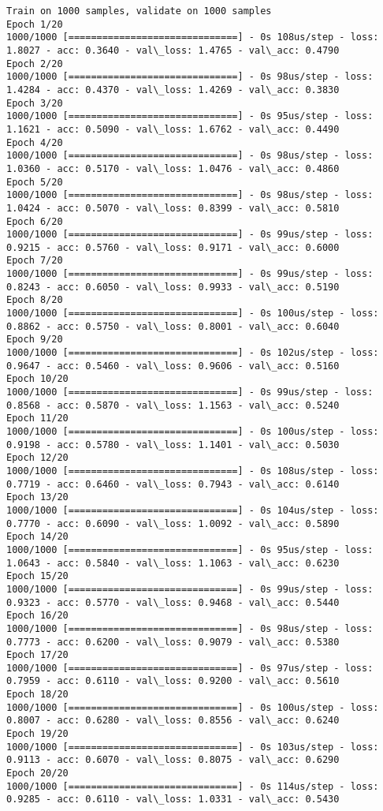 \documentclass[11pt]{article}
\begin{document}
    \begin{Verbatim}[commandchars=\\\{\}]
Train on 1000 samples, validate on 1000 samples
Epoch 1/20
1000/1000 [==============================] - 0s 108us/step - loss: 1.8027 - acc: 0.3640 - val\_loss: 1.4765 - val\_acc: 0.4790
Epoch 2/20
1000/1000 [==============================] - 0s 98us/step - loss: 1.4284 - acc: 0.4370 - val\_loss: 1.4269 - val\_acc: 0.3830
Epoch 3/20
1000/1000 [==============================] - 0s 95us/step - loss: 1.1621 - acc: 0.5090 - val\_loss: 1.6762 - val\_acc: 0.4490
Epoch 4/20
1000/1000 [==============================] - 0s 98us/step - loss: 1.0360 - acc: 0.5170 - val\_loss: 1.0476 - val\_acc: 0.4860
Epoch 5/20
1000/1000 [==============================] - 0s 98us/step - loss: 1.0424 - acc: 0.5070 - val\_loss: 0.8399 - val\_acc: 0.5810
Epoch 6/20
1000/1000 [==============================] - 0s 99us/step - loss: 0.9215 - acc: 0.5760 - val\_loss: 0.9171 - val\_acc: 0.6000
Epoch 7/20
1000/1000 [==============================] - 0s 99us/step - loss: 0.8243 - acc: 0.6050 - val\_loss: 0.9933 - val\_acc: 0.5190
Epoch 8/20
1000/1000 [==============================] - 0s 100us/step - loss: 0.8862 - acc: 0.5750 - val\_loss: 0.8001 - val\_acc: 0.6040
Epoch 9/20
1000/1000 [==============================] - 0s 102us/step - loss: 0.9647 - acc: 0.5460 - val\_loss: 0.9606 - val\_acc: 0.5160
Epoch 10/20
1000/1000 [==============================] - 0s 99us/step - loss: 0.8568 - acc: 0.5870 - val\_loss: 1.1563 - val\_acc: 0.5240
Epoch 11/20
1000/1000 [==============================] - 0s 100us/step - loss: 0.9198 - acc: 0.5780 - val\_loss: 1.1401 - val\_acc: 0.5030
Epoch 12/20
1000/1000 [==============================] - 0s 108us/step - loss: 0.7719 - acc: 0.6460 - val\_loss: 0.7943 - val\_acc: 0.6140
Epoch 13/20
1000/1000 [==============================] - 0s 104us/step - loss: 0.7770 - acc: 0.6090 - val\_loss: 1.0092 - val\_acc: 0.5890
Epoch 14/20
1000/1000 [==============================] - 0s 95us/step - loss: 1.0643 - acc: 0.5840 - val\_loss: 1.1063 - val\_acc: 0.6230
Epoch 15/20
1000/1000 [==============================] - 0s 99us/step - loss: 0.9323 - acc: 0.5770 - val\_loss: 0.9468 - val\_acc: 0.5440
Epoch 16/20
1000/1000 [==============================] - 0s 98us/step - loss: 0.7773 - acc: 0.6200 - val\_loss: 0.9079 - val\_acc: 0.5380
Epoch 17/20
1000/1000 [==============================] - 0s 97us/step - loss: 0.7959 - acc: 0.6110 - val\_loss: 0.9200 - val\_acc: 0.5610
Epoch 18/20
1000/1000 [==============================] - 0s 100us/step - loss: 0.8007 - acc: 0.6280 - val\_loss: 0.8556 - val\_acc: 0.6240
Epoch 19/20
1000/1000 [==============================] - 0s 103us/step - loss: 0.9113 - acc: 0.6070 - val\_loss: 0.8075 - val\_acc: 0.6290
Epoch 20/20
1000/1000 [==============================] - 0s 114us/step - loss: 0.9285 - acc: 0.6110 - val\_loss: 1.0331 - val\_acc: 0.5430

    \end{Verbatim}
\end{document}
